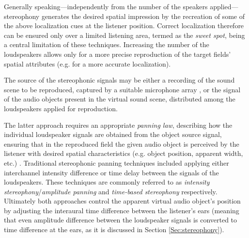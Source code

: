 Generally speaking---independently from the number of the speakers applied---stereophony generates the desired spatial impression by the recreation of some of the above localization cues at the listener position.
Correct localization therefore can be ensured only over a limited listening area, termed as the \emph{sweet spot}, being a central limitation of these techniques.
Increasing the number of the loudspeakers allows only for a more precise reproduction of the target fields' spatial attributes (e.g. for a more accurate localization).

The source of the stereophonic signals may be either a recording of the sound scene to be reproduced, captured by a suitable microphone array \cite{lipshitz1985stereo, williams1999microphone, wittek2017development}, or the signal of the audio objects present in the virtual sound scene, distributed among the loudspeakers applied for reproduction.

The latter approach requires an appropriate \emph{panning law}, describing how the individual loudspeaker signals are obtained from the object source signal, ensuring that in the reproduced field the given audio object is perceived by the listener with desired spatial characteristics (e.g. object position, apparent width, etc.) \cite{Pulkki2001a, Pulkki2001b}.
Traditional stereophonic panning techniques included applying either interchannel intensity difference or time delay between the signals of the loudspeakers.
These techniques are commonly referred to as \emph{intensity stereophony}/\emph{amplitude panning} and \emph{time-based stereophony} respectively.
Ultimately both approaches control the apparent virtual audio object's position by adjusting the interaural time difference between the listener's ears (meaning that even amplitude difference between the loudspeaker signals is converted to time difference at the ears, as it is discussed in Section \ref{Sec:stereophony}).

